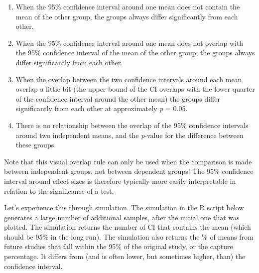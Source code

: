 \documentclass[
  oneside]{krantz}
\providecommand{\tightlist}{%
  \setlength{\itemsep}{0pt}\setlength{\parskip}{0pt}}
\begin{document}
\begin{enumerate}
\def\labelenumi{\Alph{enumi})}
\tightlist
\item
  When the 95\% confidence interval around one mean does not contain the mean of the other group, the groups always differ significantly from each other.
\item
  When the 95\% confidence interval around one mean does not overlap with the 95\% confidence interval of the mean of the other group, the groups always differ significantly from each other.
\item
  When the overlap between the two confidence intervals around each mean overlap a little bit (the upper bound of the CI overlaps with the lower quarter of the confidence interval around the other mean) the groups differ significantly from each other at approximately \emph{p} = 0.05.
\item
  There is no relationship between the overlap of the 95\% confidence intervals around two independent means, and the \emph{p}-value for the difference between these groups.
\end{enumerate}

Note that this visual overlap rule can only be used when the comparison is made between independent groups, not between dependent groups! The 95\% confidence interval around effect sizes is therefore typically more easily interpretable in relation to the significance of a test.

Let's experience this through simulation. The simulation in the R script below generates a large number of additional samples, after the initial one that was plotted. The simulation returns the number of CI that contains the mean (which should be 95\% in the long run). The simulation also returns the \% of means from future studies that fall within the 95\% of the original study, or the capture percentage. It differs from (and is often lower, but sometimes higher, than) the confidence interval.
\end{document}
